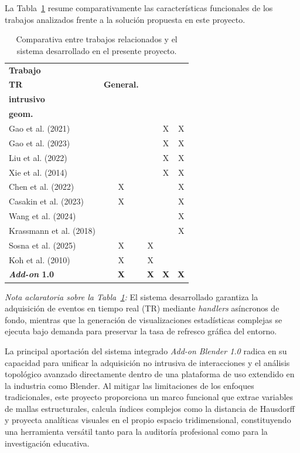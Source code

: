 La Tabla~\ref{tab:comparativa_trabajos} resume comparativamente las características funcionales de los trabajos analizados frente a la solución propuesta en este proyecto.

\begin{table}[H]
\centering
\scriptsize
\renewcommand{\arraystretch}{1.15}
\setlength{\tabcolsep}{2.5pt}
\begin{tabularx}{\textwidth}{Xcccc}
\toprule
\textbf{Trabajo} &
\makecell{\textbf{Adquisición}\\\textbf{TR}} &
\textbf{General.} &
\makecell{\textbf{No}\\\textbf{intrusivo}} &
\makecell{\textbf{Análisis}\\\textbf{geom.}} \\
\midrule
Gao et al. (2021)       &   &   & X & X \\
Gao et al. (2023)       &   &   & X & X \\
Liu et al. (2022)       &   &   & X & X \\
Xie et al. (2014)       &   &   & X & X \\
Chen et al. (2022)      & X &   &   & X \\
Casakin et al. (2023)   & X &   &   & X \\
Wang et al. (2024)      &   &   &   & X \\
Krassmann et al. (2018) &   &   &   & X \\
Sosna et al. (2025)     & X & X &   &   \\
Koh et al. (2010)       & X & X &   &   \\
\textbf{\textit{Add-on} 1.0} & \textbf{X} & \textbf{X} & \textbf{X} & \textbf{X} \\
\bottomrule
\end{tabularx}
\caption{Comparativa entre trabajos relacionados y el sistema desarrollado en el presente proyecto.}
\label{tab:comparativa_trabajos}
\end{table}

\textit{Nota aclaratoria sobre la Tabla~\ref{tab:comparativa_trabajos}:} El sistema desarrollado garantiza la adquisición de eventos en tiempo real (TR) mediante \textit{handlers} asíncronos de fondo, mientras que la generación de visualizaciones estadísticas complejas se ejecuta bajo demanda para preservar la tasa de refresco gráfica del entorno.

La principal aportación del sistema integrado \textit{Add-on Blender 1.0} radica en su capacidad para unificar la adquisición no intrusiva de interacciones y el análisis topológico avanzado directamente dentro de una plataforma de uso extendido en la industria como Blender. Al mitigar las limitaciones de los enfoques tradicionales, este proyecto proporciona un marco funcional que extrae variables de mallas estructurales, calcula índices complejos como la distancia de Hausdorff y proyecta analíticas visuales en el propio espacio tridimensional, constituyendo una herramienta versátil tanto para la auditoría profesional como para la investigación educativa.